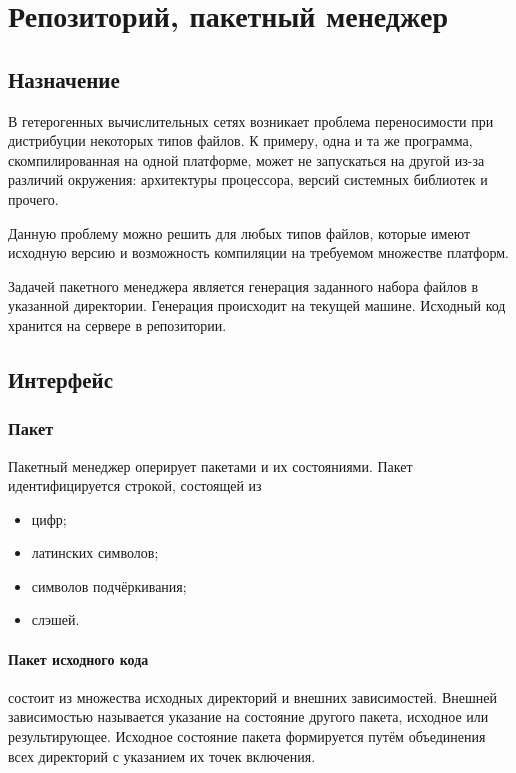 \section{Репозиторий, пакетный менеджер}
\label{bunsanpm}

\subsection{Назначение}
В гетерогенных вычислительных сетях возникает проблема переносимости
при дистрибуции некоторых типов файлов. К примеру, одна и та же
программа, скомпилированная на одной платформе, может не запускаться
на другой из-за различий окружения: архитектуры процессора, версий системных
библиотек и прочего.

Данную проблему можно решить для любых типов файлов,
которые имеют исходную версию и возможность
компиляции на требуемом множестве платформ.

Задачей пакетного менеджера является генерация заданного набора файлов
в указанной директории. Генерация происходит на текущей машине.
Исходный код хранится на сервере в репозитории.

\subsection{Интерфейс}

\subsubsection{Пакет}
Пакетный менеджер оперирует пакетами и их состояниями.
Пакет идентифицируется строкой, состоящей из
\begin{itemize}
    \item цифр;
    \item латинских символов;
    \item символов подчёркивания;
    \item слэшей.
\end{itemize}

\paragraph{Пакет исходного кода} состоит из множества исходных директорий
и внешних зависимостей. Внешней зависимостью называется указание на состояние другого пакета,
исходное или результирующее. Исходное состояние пакета формируется путём объединения
всех директорий с указанием их точек включения.

